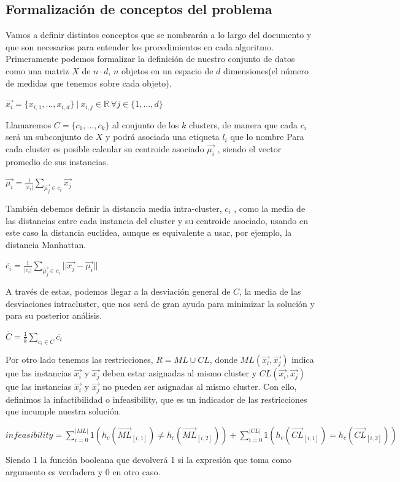 \documentclass{article}
\providecommand{\abs}[1]{\lvert#1\rvert}
\begin{document}
	\subsection{Formalización de conceptos del problema}
	Vamos a definir distintos conceptos que se nombrarán a lo largo del documento y que son
	necesarios para entender los procedimientos en cada algoritmo.
	Primeramente podemos formalizar la definición de nuestro conjunto de datos como una matriz $X$ de
	$n\cdot d$, $n$ objetos en un espacio de $d$ dimensiones(el número de medidas que tenemos sobre cada
	objeto).\par
	{\centering $\vec{x_i} =\{x_{i,1},...,x_{i,d}\}\ \vert \ x_{i,j}\in \mathbb R\ \forall j\in \{1,...,d\}$\par}
	Llamaremos $C=\{c_1,...,c_k\}$ al conjunto de los $k$ clusters, de manera que cada $c_i$ será un subconjunto
	de $X$ y podrá asociada una etiqueta $l_i$ que lo nombre Para cada cluster es posible calcular su
	centroide asociado $\vec{\mu_i} $ , siendo el vector promedio de sus instancias.\par
	{\centering $\vec{\mu_i} = \frac{1}{\abs{c_i}} \displaystyle\sum_{\vec{\mu_j} \in c_i} \vec{x_j}$\par}
	También debemos definir la distancia media intra-cluster, $c_i$ , como la media de las distancias
	entre cada instancia del cluster y su centroide asociado, usando en este caso la distancia euclídea,
	aunque es equivalente a usar, por ejemplo, la distancia Manhattan.\par
	{\centering ${\overline{c_i}} = \frac{1}{\abs{c_i}} \displaystyle\sum_{\vec{\mu_j} \in c_i} \abs{\abs{\vec{x_j}-\vec{\mu_i}}} $\par}
	A través de estas, podemos llegar a la desviación general de $C$, la media de las desviaciones intracluster,
	que nos será de gran ayuda para minimizar la solución y para su posterior análisis.\par
	{\centering ${\overline{C}} = \frac{1}{k} \displaystyle\sum_{c_i \in C} \overline{c_i}$\par}
	Por otro lado tenemos las restricciones, $R=ML\cup CL$, donde $ML(\vec{x_i},\vec{x_j})$ indica que las
	instancias $\vec{x_i}$ y $\vec{x_j}$ deben estar asignadas al mismo cluster y $CL(\vec{x_i},\vec{x_j})$ que las instancias
	$\vec{x_i}$ y $\vec{x_j}$ no pueden ser asignadas al mismo cluster. Con ello, definimos la infactibilidad o
	infeasibility, que es un indicador de las restricciones que incumple nuestra solución.\par
	{\centering $infeasibility=\displaystyle\sum_{i=0}^{\abs{ML}}1(h_c(\vec{ML}_{[i,1]})\neq h_c(\vec{ML}_{[i,2]}))+\displaystyle\sum_{i=0}^{\abs{CL}}1(h_c(\vec{CL}_{[i,1]})=h_c(\vec{CL}_{[i,2]}))$\par}
	Siendo 1 la función booleana que devolverá 1 si la expresión que toma como argumento es verdadera y 0 en otro caso.
	
\end{document}
